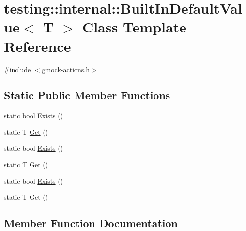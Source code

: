 \hypertarget{classtesting_1_1internal_1_1_built_in_default_value}{}\section{testing\+::internal\+::Built\+In\+Default\+Value$<$ T $>$ Class Template Reference}
\label{classtesting_1_1internal_1_1_built_in_default_value}


{\ttfamily \#include $<$gmock-\/actions.\+h$>$}

\subsection*{Static Public Member Functions}
\begin{DoxyCompactItemize}
\item 
static bool \mbox{\hyperlink{classtesting_1_1internal_1_1_built_in_default_value_a35207bc20a493b0efb3980eb9a08dd2f}{Exists}} ()
\item 
static T \mbox{\hyperlink{classtesting_1_1internal_1_1_built_in_default_value_a7e26c1df14a887c8f393b29d6ea162e6}{Get}} ()
\item 
static bool \mbox{\hyperlink{classtesting_1_1internal_1_1_built_in_default_value_a35207bc20a493b0efb3980eb9a08dd2f}{Exists}} ()
\item 
static T \mbox{\hyperlink{classtesting_1_1internal_1_1_built_in_default_value_a7e26c1df14a887c8f393b29d6ea162e6}{Get}} ()
\item 
static bool \mbox{\hyperlink{classtesting_1_1internal_1_1_built_in_default_value_a35207bc20a493b0efb3980eb9a08dd2f}{Exists}} ()
\item 
static T \mbox{\hyperlink{classtesting_1_1internal_1_1_built_in_default_value_a7e26c1df14a887c8f393b29d6ea162e6}{Get}} ()
\end{DoxyCompactItemize}


\subsection{Member Function Documentation}
\mbox{\label{classtesting_1_1internal_1_1_built_in_default_value_a35207bc20a493b0efb3980eb9a08dd2f}} 
